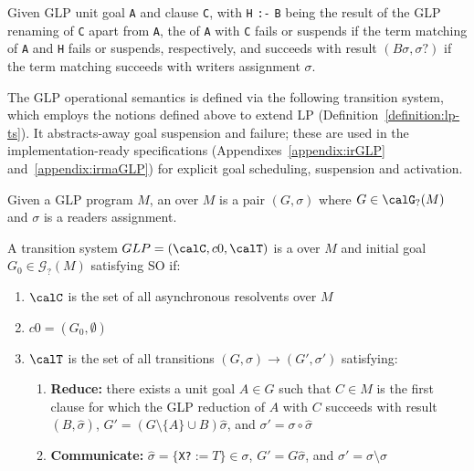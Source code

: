 \begin{definition}\label{definition:GLP-goal-clause-reduction}
Given GLP unit goal \verb|A| and clause \verb|C|, with \verb|H| \verb|:-| \verb|B| being the result of the GLP renaming of \verb|C| apart from \verb|A|, the  of \verb|A| with \verb|C| fails or suspends if the term matching of \verb|A| and \verb|H| fails or suspends, respectively, and succeeds with result $(B\sigma, \sigma?)$ if the term matching succeeds with writers assignment $\sigma$.
\end{definition}



The GLP operational semantics is defined via the following transition system, which employs the notions defined above to extend LP (Definition~\ref{definition:lp-ts}). It abstracts-away goal suspension and failure; these are used in the implementation-ready specifications (Appendixes~\ref{appendix:irGLP} and~\ref{appendix:irmaGLP}) for explicit goal scheduling, suspension and activation.

\begin{definition}\label{definition:GLP-ts}
Given a GLP program $M$, an  over $M$ is a pair $(G,\sigma)$ where $G\in \calG_?(M)$ and $\sigma$ is a readers assignment.

A transition system $GLP = (\calC,c0,\calT)$ is a  over $M$ and initial goal $G_0 \in \mathcal{G}_?(M)$ satisfying SO if:
\begin{enumerate}
    \item $\calC$ is the set of all asynchronous resolvents over $M$
    \item $c0= (G_0,\emptyset)$
    \item $\calT$ is the set of all transitions $(G,\sigma)\rightarrow (G',\sigma')$ satisfying:
    \begin{enumerate}
     \item \textbf{Reduce:} there exists a unit goal $A \in G$ such that $C \in M$ is the first clause for which the GLP reduction of $A$ with $C$ succeeds with result $(B, \hat\sigma)$, $G' = (G \setminus \{A\} \cup B)\hat\sigma$, and $\sigma' = \sigma \circ \hat\sigma$
        \item \textbf{Communicate:} $\hat\sigma = \{$\verb|X?|$:=T\} \in \sigma$, $G'= G\hat\sigma$, and $\sigma' = \sigma \setminus \hat\sigma$
    \end{enumerate}
\end{enumerate}
\end{definition}


